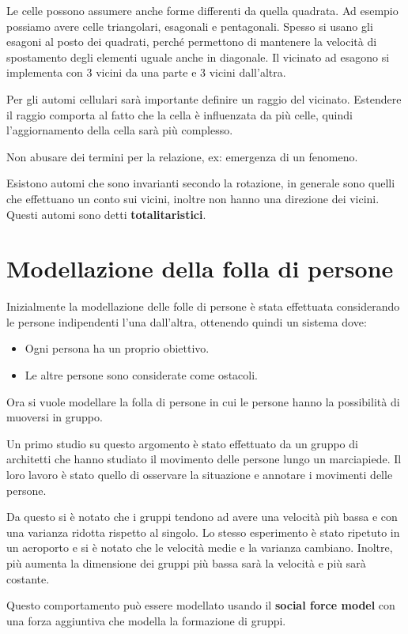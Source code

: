 \begin{nota}
    Le celle possono assumere anche forme differenti da quella quadrata. Ad esempio
    possiamo avere celle triangolari, esagonali e pentagonali. Spesso si usano gli
    esagoni al posto dei quadrati, perché permettono di mantenere la velocità di
    spostamento degli elementi uguale anche in diagonale. Il vicinato ad esagono si
    implementa con 3 vicini da una parte e 3 vicini dall'altra.
\end{nota}
Per gli automi cellulari sarà importante definire un raggio del vicinato. Estendere
il raggio comporta al fatto che la cella è influenzata da più celle, quindi
l'aggiornamento della cella sarà più complesso.
\begin{nota}
    Non abusare dei termini per la relazione, ex: emergenza di un fenomeno.
\end{nota}
Esistono automi che sono invarianti secondo la rotazione, in generale sono quelli
che effettuano un conto sui vicini, inoltre non hanno una direzione dei vicini.
Questi automi sono detti \textbf{totalitaristici}.
\section{Modellazione della folla di persone}
Inizialmente la modellazione delle folle di persone è stata effettuata considerando
le persone indipendenti l'una dall'altra, ottenendo quindi un sistema dove:
\begin{itemize}
    \item Ogni persona ha un proprio obiettivo.
    \item Le altre persone sono considerate come ostacoli.
\end{itemize}
Ora si vuole modellare la folla di persone in cui le persone hanno la possibilità
di muoversi in gruppo.

Un primo studio su questo argomento è stato effettuato da un gruppo di architetti
che hanno studiato il movimento delle persone lungo un marciapiede. Il loro lavoro
è stato quello di osservare la situazione e annotare i movimenti delle persone.

Da questo si è notato che i gruppi tendono ad avere una velocità più bassa e con
una varianza ridotta rispetto al singolo. Lo stesso esperimento è stato ripetuto
in un aeroporto e si è notato che le velocità medie e la varianza cambiano.
Inoltre, più aumenta la dimensione dei gruppi più bassa sarà la velocità e più
sarà costante.

Questo comportamento può essere modellato usando il \textbf{social force model}
con una forza aggiuntiva che modella la formazione di gruppi.

